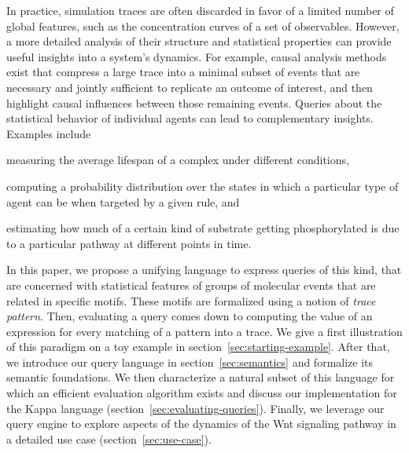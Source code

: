\documentclass[runningheads]{llncs}
\begin{document}
In practice, simulation traces are often discarded in favor of a
limited number of global features, such
as the concentration curves of a set of observables. However, a more
detailed analysis of their structure and statistical properties can
provide useful insights into a system's dynamics. For example, causal
analysis methods exist
\cite{DanosEtAl-CONCUR07,DBLP:conf/fsttcs/DanosFFHH12} that compress a
large trace into a minimal subset of events that are necessary and
jointly sufficient to replicate an outcome of interest, and then
highlight causal influences between those remaining events.
Queries about the statistical behavior of individual agents can
lead to complementary insights. Examples include
\begin{inparaenum}[(i)]
\item measuring the average lifespan of a complex under different
  conditions,
\item computing a probability distribution over the states in which a
  particular type of agent can be when targeted by a given rule, and
\item estimating how much of a certain kind of substrate getting
  phosphorylated is due to a particular pathway at different points in
  time.
\end{inparaenum}

In this paper, we propose a unifying language to express queries of
this kind, that are concerned with statistical features of groups of
molecular events that are related in specific motifs. These motifs are
formalized using a notion of \emph{trace pattern}. Then, evaluating a
query comes down to computing the value of an expression for every
matching of a pattern into a trace. We give a first illustration of
this paradigm on a toy example in
section~\ref{sec:starting-example}. After that, we introduce our query
language in section~\ref{sec:semantics} and formalize its semantic
foundations. We then characterize a natural subset of this language
for which an efficient evaluation algorithm exists and discuss our
implementation for the Kappa language
(section~\ref{sec:evaluating-queries}). Finally, we leverage our query
engine to explore aspects of the dynamics of the Wnt signaling
pathway in a detailed use case (section~\ref{sec:use-case}).

\end{document}
